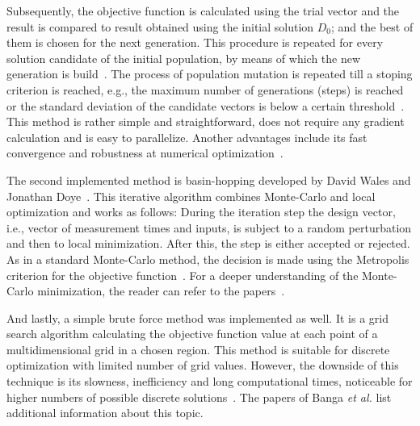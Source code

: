 \documentclass[graybox]{svmult}
\newcommand{\etal}{{\textit{et al. }}}
\begin{document}
Subsequently, the objective function is calculated using the trial vector and the result is compared to result obtained using the initial solution $D_0$; and the best of them is chosen for the next generation.
This procedure is repeated for every solution candidate of the initial population, by means of which the new generation is build~\cite{scipydiffev}.
The process of population mutation is repeated till a stoping criterion is reached, e.g., the maximum number of generations (steps) is reached or the standard deviation of the candidate vectors is below a certain threshold~\cite{Zielinski_DE}.
This method is rather simple and straightforward, does not require any gradient calculation and is easy to parallelize.
Another advantages include its fast convergence and robustness at numerical optimization~\cite{babu_differential_2007}.
\newline

The second implemented method is basin-hopping developed by David Wales and Jonathan Doye~\cite{wales_global_1997}.
This iterative algorithm combines Monte-Carlo and local optimization and works as follows:
During the iteration step the design vector, i.e., vector of measurement times and inputs, is subject to a random perturbation and then to local minimization.
After this, the step is either accepted or rejected.
As in a standard Monte-Carlo method, the decision is made using the Metropolis criterion for the objective function~\cite{scipybashop}.
For a deeper understanding of the Monte-Carlo minimization, the reader can refer to the papers~\cite{li_monte_1987, beichl_metropolis_2000}.
\newline

And lastly, a simple brute force method was implemented as well.
It is a grid search algorithm calculating the objective function value at each point of a multidimensional grid in a chosen region.
This method is suitable for discrete optimization with limited number of grid values.
However, the downside of this technique is its slowness, inefficiency and long computational times, noticeable for higher numbers of possible discrete solutions~\cite{scipybrute}.
The papers of Banga \etal \cite{banga_global_1996, banga_dynamic_2005, bangaImprovingFoodProcessing2003} list additional information about this topic.
%
\end{document}
